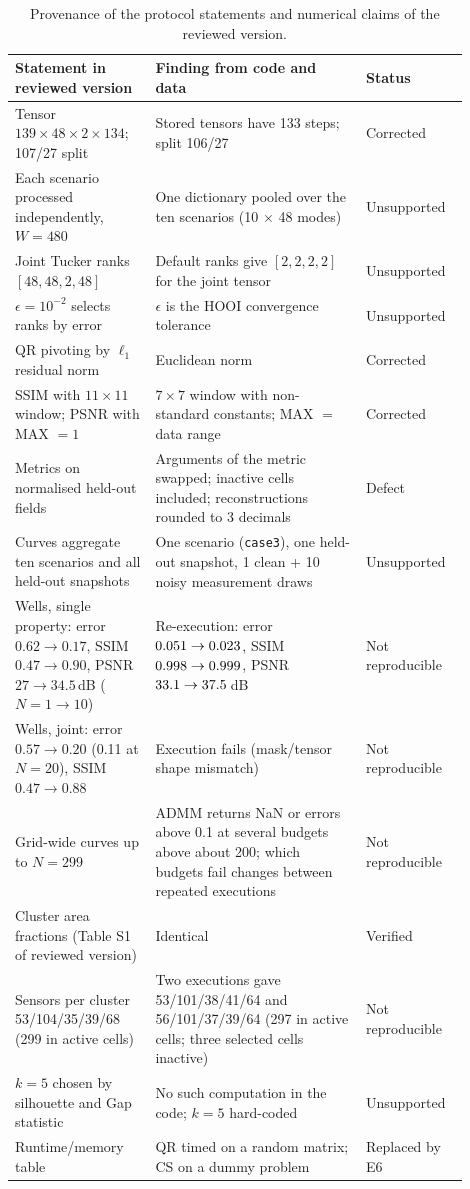 \begin{table}[htbp]
\centering
\scriptsize
\caption{Provenance of the protocol statements and numerical claims of the reviewed version.}
\label{tab:S_audit}
\begin{tabular}{@{}p{0.29\linewidth}p{0.42\linewidth}p{0.19\linewidth}@{}}
\toprule
Statement in reviewed version & Finding from code and data & Status \\
\midrule
Tensor $139\times48\times2\times134$; 107/27 split & Stored tensors have 133 steps; split 106/27 & Corrected \\
Each scenario processed independently, $W=480$ & One dictionary pooled over the ten scenarios (10 $\times$ 48 modes) & Unsupported \\
Joint Tucker ranks $[48,48,2,48]$ & Default ranks give $[2,2,2,2]$ for the joint tensor & Unsupported \\
$\epsilon=10^{-2}$ selects ranks by error & $\epsilon$ is the HOOI convergence tolerance & Unsupported \\
QR pivoting by $\ell_1$ residual norm & Euclidean norm & Corrected \\
SSIM with $11\times11$ window; PSNR with MAX $=1$ & $7\times7$ window with non-standard constants; MAX $=$ data range & Corrected \\
Metrics on normalised held-out fields & Arguments of the metric swapped; inactive cells included; reconstructions rounded to 3 decimals & Defect \\
Curves aggregate ten scenarios and all held-out snapshots & One scenario (\texttt{case3}), one held-out snapshot, 1 clean + 10 noisy measurement draws & Unsupported \\
Wells, single property: error $0.62\to0.17$, SSIM $0.47\to0.90$, PSNR $27\to34.5$\,dB ($N=1\to10$) & Re-execution: error $0.051\to0.023$, SSIM $0.998\to0.999$, PSNR $33.1\to37.5$\,dB & Not reproducible \\
Wells, joint: error $0.57\to0.20$ (0.11 at $N=20$), SSIM $0.47\to0.88$ & Execution fails (mask/tensor shape mismatch) & Not reproducible \\
Grid-wide curves up to $N=299$ & ADMM returns NaN or errors above 0.1 at several budgets above about 200; which budgets fail changes between repeated executions & Not reproducible \\
Cluster area fractions (Table S1 of reviewed version) & Identical & Verified \\
Sensors per cluster 53/104/35/39/68 (299 in active cells) & Two executions gave 53/101/38/41/64 and 56/101/37/39/64 (297 in active cells; three selected cells inactive) & Not reproducible \\
$k=5$ chosen by silhouette and Gap statistic & No such computation in the code; $k=5$ hard-coded & Unsupported \\
Runtime/memory table & QR timed on a random matrix; CS on a dummy problem & Replaced by E6 \\
\bottomrule
\end{tabular}
\end{table}

